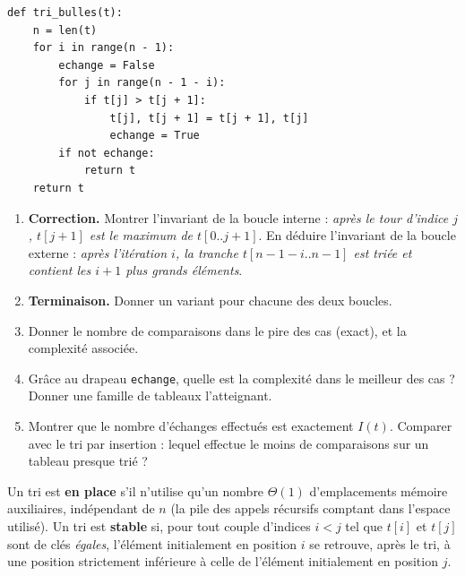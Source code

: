 \documentclass[11pt,a4paper]{article}
\begin{document}
\begin{lstlisting}
def tri_bulles(t):
    n = len(t)
    for i in range(n - 1):
        echange = False
        for j in range(n - 1 - i):
            if t[j] > t[j + 1]:
                t[j], t[j + 1] = t[j + 1], t[j]
                echange = True
        if not echange:
            return t
    return t
\end{lstlisting}

\begin{enumerate}[label=\arabic*.,leftmargin=*]
  \item \textbf{Correction.} Montrer l'invariant de la boucle interne : \emph{après le
        tour d'indice $j$, $t[j+1]$ est le maximum de $t[0..j+1]$}. En déduire
        l'invariant de la boucle externe : \emph{après l'itération $i$, la tranche
        $t[n-1-i..n-1]$ est triée et contient les $i+1$ plus grands éléments}.
  \item \textbf{Terminaison.} Donner un variant pour chacune des deux boucles.
  \item Donner le nombre de comparaisons dans le pire des cas (exact), et la complexité
        associée.
  \item Grâce au drapeau \texttt{echange}, quelle est la complexité dans le meilleur des
        cas ? Donner une famille de tableaux l'atteignant.
  \item Montrer que le nombre d'échanges effectués est exactement $I(t)$.
        Comparer avec le tri par insertion : lequel effectue le moins de comparaisons
        sur un tableau presque trié ?
\end{enumerate}

\begin{rappel}[Définitions]
Un tri est \textbf{en place} s'il n'utilise qu'un nombre $\Theta(1)$ d'emplacements
mémoire auxiliaires, indépendant de $n$ (la pile des appels récursifs comptant dans
l'espace utilisé).
Un tri est \textbf{stable} si, pour tout couple d'indices $i<j$ tel que
$t[i]$ et $t[j]$ sont de clés \emph{égales}, l'élément initialement en position $i$ se
retrouve, après le tri, à une position strictement inférieure à celle de l'élément
initialement en position $j$.
\end{rappel}
\end{document}
